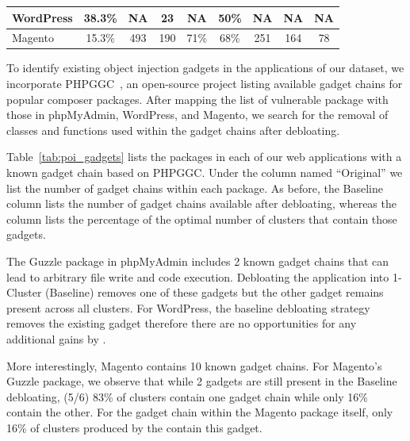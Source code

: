 \begin{table}[]
{\begin{tabular}{|l|c|c|c|c|c|ccc|}
    WordPress                                   & 38.3\%                                                                                          & NA                                    & 23                                   & NA                                                             & 50\%                                    & \multicolumn{1}{c|}{NA}                         & \multicolumn{1}{c|}{NA}                 & \multicolumn{1}{c|}{NA}  \\ \hline
    Magento                                     & 15.3\%                                                                                          & 493                                   & 190                                  & 71\%                                                           & 68\%                                    & \multicolumn{1}{c|}{251}                        & \multicolumn{1}{c|}{164}                & \multicolumn{1}{c|}{78}  \\ \hline
    \end{tabular}
    }
\end{table}

To identify existing object injection gadgets in the applications of our dataset, we incorporate PHPGGC~\cite{PHPGGC}, an open-source project listing available gadget chains for popular composer packages. 
After mapping the list of vulnerable package with those in phpMyAdmin, WordPress, and Magento, we search for the removal of classes and functions used within the gadget chains after debloating. 

Table~\ref{tab:poi_gadgets} lists the packages in each of our web applications with a known gadget chain based on PHPGGC. 
Under the column named ``Original'' we list the number of gadget chains within each package. 
As before, the Baseline column lists the number of gadget chains available after debloating, whereas the \sys{} column lists the percentage of the optimal number of clusters that contain those gadgets. 

The Guzzle package in phpMyAdmin includes 2 known gadget chains that can lead to arbitrary file write and code execution. 
Debloating the application into 1-Cluster (Baseline) removes one of these gadgets but the other gadget remains present across all clusters. 
For WordPress, the baseline debloating strategy removes the existing gadget therefore there are no opportunities for any additional gains by \sys{}.

More interestingly, Magento contains 10 known gadget chains. 
For Magento's Guzzle package, we observe that while 2 gadgets are still present in the Baseline debloating, (5/6) 83\% of clusters contain one gadget chain while only 16\% contain the other. 
For the gadget chain within the Magento package itself, only 16\% of clusters produced by the \sys{} contain this gadget. 

